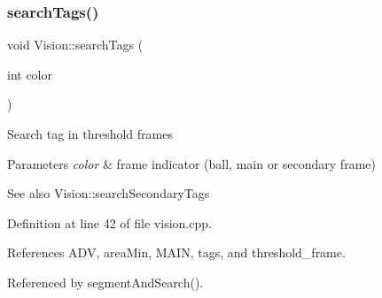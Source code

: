 \subsubsection{\texorpdfstring{search\+Tags()}{searchTags()}}
{\footnotesize\ttfamily void Vision\+::search\+Tags (\begin{DoxyParamCaption}\item[{int}]{color }\end{DoxyParamCaption})\hspace{0.3cm}{\ttfamily [private]}}

Search tag in threshold frames 
\begin{DoxyParams}{Parameters}
{\em color} & frame indicator (ball, main or secondary frame) \\
\hline
\end{DoxyParams}
\begin{DoxySeeAlso}{See also}
Vision\+::search\+Secondary\+Tags 
\end{DoxySeeAlso}


Definition at line 42 of file vision.\+cpp.



References A\+DV, area\+Min, M\+A\+IN, tags, and threshold\+\_\+frame.



Referenced by segment\+And\+Search().


